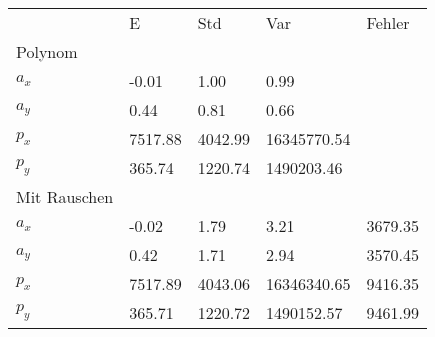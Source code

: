 \begin{tabular}{l|l|l|l|l}

         & E       & Std    & Var    & Fehler \\ 

\hhline{=|=|=|=|=}
Polynom & & & & \\ 

$a_x$  &        -0.01 &         1.00 &         0.99 & \\ 

$a_y$  &         0.44 &         0.81 &         0.66 & \\ 

$p_x$  &      7517.88 &      4042.99 &  16345770.54 & \\ 

$p_y$  &       365.74 &      1220.74 &   1490203.46 & \\ 

\hline 

Mit Rauschen & & & & \\ 

$a_x$  &        -0.02 &         1.79 &         3.21 &      3679.35 \\ 

$a_y$  &         0.42 &         1.71 &         2.94 &      3570.45 \\ 

$p_x$  &      7517.89 &      4043.06 &  16346340.65 &      9416.35 \\ 

$p_y$  &       365.71 &      1220.72 &   1490152.57 &      9461.99 \\ 

\end{tabular}

